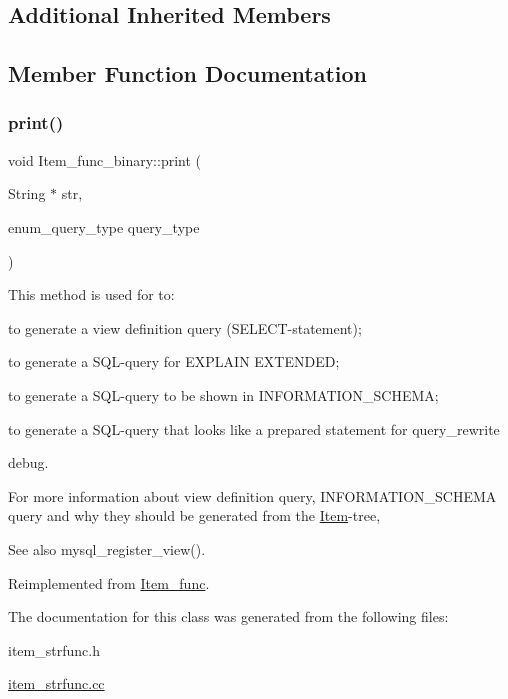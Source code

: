 \subsection*{Additional Inherited Members}


\subsection{Member Function Documentation}
\mbox{\label{classItem__func__binary_a844fa037571955cec5ce1a8d64eb33c1}} 
\subsubsection{\texorpdfstring{print()}{print()}}
{\footnotesize\ttfamily void Item\+\_\+func\+\_\+binary\+::print (\begin{DoxyParamCaption}\item[{String $\ast$}]{str,  }\item[{enum\+\_\+query\+\_\+type}]{query\+\_\+type }\end{DoxyParamCaption})\hspace{0.3cm}{\ttfamily [virtual]}}

This method is used for to\+:
\begin{DoxyItemize}
\item to generate a view definition query (S\+E\+L\+E\+CT-\/statement);
\item to generate a S\+QL-\/query for E\+X\+P\+L\+A\+IN E\+X\+T\+E\+N\+D\+ED;
\item to generate a S\+QL-\/query to be shown in I\+N\+F\+O\+R\+M\+A\+T\+I\+O\+N\+\_\+\+S\+C\+H\+E\+MA;
\item to generate a S\+QL-\/query that looks like a prepared statement for query\+\_\+rewrite
\item debug.
\end{DoxyItemize}

For more information about view definition query, I\+N\+F\+O\+R\+M\+A\+T\+I\+O\+N\+\_\+\+S\+C\+H\+E\+MA query and why they should be generated from the \mbox{\hyperlink{classItem}{Item}}-\/tree, \begin{DoxySeeAlso}{See also}
mysql\+\_\+register\+\_\+view(). 
\end{DoxySeeAlso}


Reimplemented from \mbox{\hyperlink{classItem__func_afb302ee25d4721ace27d3f5053d4ee41}{Item\+\_\+func}}.



The documentation for this class was generated from the following files\+:\begin{DoxyCompactItemize}
\item 
item\+\_\+strfunc.\+h\item 
\mbox{\hyperlink{item__strfunc_8cc}{item\+\_\+strfunc.\+cc}}\end{DoxyCompactItemize}
